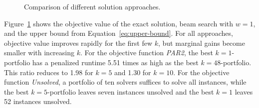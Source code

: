 \documentclass[conference]{IEEEtran}
\begin{document}
\begin{figure}[t]
	\centering
	\hfil
	\caption{Comparison of different solution approaches.}
	\label{fig:objective}
\end{figure}

Figure~\ref{fig:objective} shows the objective value of the exact solution, beam search with $w=1$, and the upper bound from Equation~\ref{eq:upper-bound}.
For all approaches, objective value improves rapidly for the first few $k$, but marginal gains become smaller with increasing $k$.
For the objective function \emph{PAR2}, the best $k=1$-portfolio has a penalized runtime 5.51 times as high as the best
$k=48$-portfolio.
This ratio reduces to 1.98 for $k=5$ and 1.30 for $k=10$.
For the objective function \emph{Unsolved}, a portfolio of ten solvers suffices to solve all instances, while the best $k=5$-portfolio leaves seven instances unsolved and the best $k=1$ leaves 52 instances unsolved.
\end{document}
